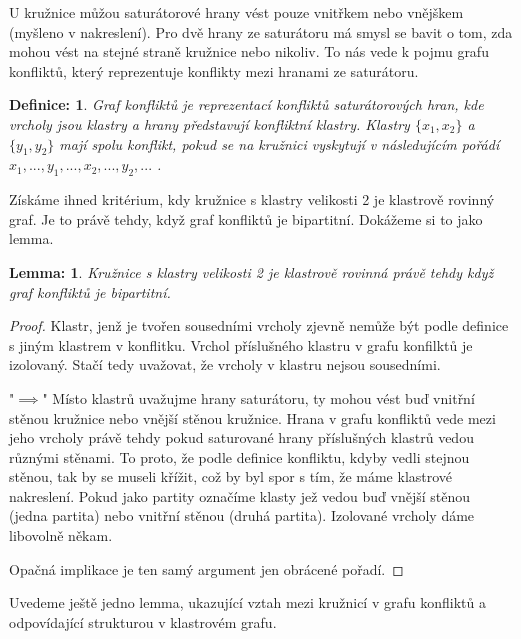 \documentclass[12pt,a4report]{report}
\newtheorem{defn}{Definice: }[chapter]
\newtheorem{lemma}{Lemma: }[chapter]
\begin{document}
U kružnice můžou saturátorové hrany vést pouze vnitřkem nebo vnějškem (myšleno v nakreslení). Pro dvě hrany ze saturátoru má smysl se bavit o tom, zda mohou vést na stejné straně kružnice nebo nikoliv. To nás vede k pojmu grafu konfliktů, který reprezentuje konflikty mezi hranami ze saturátoru. 

\begin{defn}
Graf konfliktů je reprezentací konfliktů saturátorových hran, kde vrcholy jsou klastry a hrany představují konfliktní klastry. Klastry $\{x_1, x_2\}$ a $\{y_1, y_2\}$ mají spolu konflikt, pokud se na kružnici vyskytují v následujícím pořádí $x_1 , ..., y_1, ..., x_2, ..., y_2, ...$ .
\end{defn}

Získáme ihned kritérium, kdy kružnice s klastry velikosti 2 je klastrově rovinný graf. Je to právě tehdy, když graf konfliktů je bipartitní. Dokážeme si to jako lemma.

\begin{lemma}Kružnice s klastry velikosti 2 je klastrově rovinná právě tehdy když graf konfliktů je bipartitní.
\end{lemma}
\begin{proof}
Klastr, jenž je tvořen sousedními vrcholy zjevně nemůže být podle definice s jiným klastrem v konflitku. Vrchol příslušného klastru v grafu konfilktů je izolovaný. Stačí tedy uvažovat, že vrcholy v klastru nejsou sousedními.

"$\implies$"
Místo klastrů uvažujme hrany saturátoru, ty mohou vést buď vnitřní stěnou kružnice nebo vnější stěnou kružnice. Hrana v grafu konfliktů vede mezi jeho vrcholy právě tehdy pokud saturované hrany příslušných klastrů vedou různými stěnami. To proto, že podle definice konfliktu, kdyby vedli stejnou stěnou, tak by se museli křížit, což by byl spor s tím, že máme klastrové nakreslení. Pokud jako partity označíme klasty jež vedou buď vnější stěnou (jedna partita) nebo vnitřní stěnou (druhá partita). Izolované vrcholy dáme libovolně někam.

Opačná implikace je ten samý argument jen obrácené pořadí.
\end{proof}

Uvedeme ještě jedno lemma, ukazující vztah mezi kružnicí v grafu konfliktů a odpovídající strukturou v klastrovém grafu.
\end{document}
